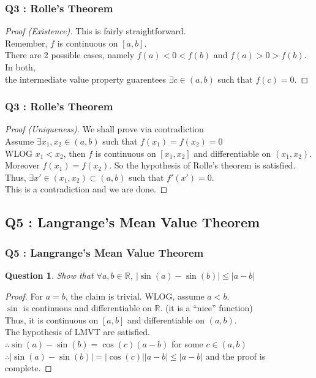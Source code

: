 \documentclass[handout,aspectratio=169]{beamer}
\newtheorem{qsn}{Question}
\newcommand{\bR}{\mathbb{R}}
\begin{document}
\begin{frame}
\frametitle{Q3 : Rolle's Theorem}
\begin{proof}[Proof (Existence)]
This is fairly straightforward. \\ \pause
Remember, $f$ is continuous on $[a,b]$. \\ \pause
There are 2 possible cases, namely $f(a)<0<f(b)$ and $f(a)>0>f(b)$. In both, \\ \pause
the intermediate value property guarentees $\exists c \in (a,b)$ such that $f(c)=0$.
\end{proof}
\end{frame}

\begin{frame}
\frametitle{Q3 : Rolle's Theorem}
\begin{proof}[Proof (Uniqueness)]
\pause
We shall prove via contradiction \\ \pause
Assume $\exists x_1,x_2 \in (a,b)$ such that $f(x_1) = f(x_2) = 0$ \\ \pause
WLOG $x_1<x_2$, then $f$ is continuous on $[x_1,x_2]$ and differentiable on $(x_1,x_2)$. \\ \pause
Moreover $f(x_1) = f(x_2)$. So the hypothesis of Rolle's theorem is satisfied.\\ \pause
Thus, $\exists x' \in (x_1,x_2) \subset (a,b)$ such that $f'(x')=0$.\\
This is a contradiction and we are done.
\end{proof}
\end{frame}

\subsection{Q5 : Langrange's Mean Value Theorem}

\begin{frame}
\frametitle{Q5 : Langrange's Mean Value Theorem}
\begin{qsn}
Show that $\forall a,b \in \bR$, $|\sin(a)-\sin(b)| \leq |a-b|$
\end{qsn}
\pause
\begin{proof}
For $a=b$, the claim is trivial. WLOG, assume $a<b$. \\ \pause
$\sin$ is continuous and differentiable on $\bR$. (it is a ``nice'' function) \\ \pause
Thus, it is continuous on $[a,b]$ and differentiable on $(a,b)$.\\
The hypothesis of LMVT are satisfied.\\ \pause
$\therefore \sin(a)-\sin(b) = \cos(c) (a-b)$ for some $c\in (a,b)$ \\ \pause
$\therefore |\sin(a)-\sin(b)| = |\cos(c)| |a-b| \leq |a-b|$ and the proof is complete.
\end{proof}
\end{frame}
\end{document}
